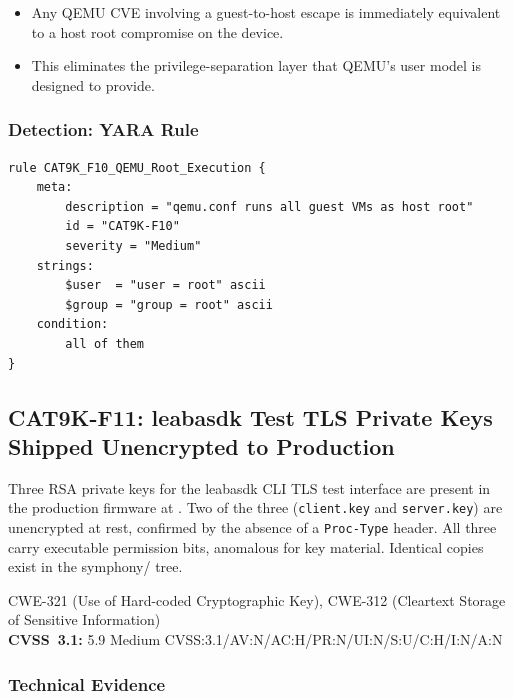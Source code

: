 \documentclass[11pt,a4paper]{article}
\begin{document}
\begin{itemize}[nosep]
  \item Any QEMU CVE involving a guest-to-host escape is immediately equivalent to
    a host root compromise on the device.
  \item This eliminates the privilege-separation layer that QEMU's user model is
    designed to provide.
\end{itemize}

\subsubsection{Detection: YARA Rule}

\begin{lstlisting}[style=yara]
rule CAT9K_F10_QEMU_Root_Execution {
    meta:
        description = "qemu.conf runs all guest VMs as host root"
        id = "CAT9K-F10"
        severity = "Medium"
    strings:
        $user  = "user = root" ascii
        $group = "group = root" ascii
    condition:
        all of them
}
\end{lstlisting}

\subsection{CAT9K-F11: leabasdk Test TLS Private Keys Shipped Unencrypted to Production}

\begin{overviewbox}
Three RSA private keys for the leabasdk CLI TLS test interface are present in the
production firmware at
. Two of the three
(\texttt{client.key} and \texttt{server.key}) are unencrypted at rest, confirmed by
the absence of a \texttt{Proc-Type} header. All three carry executable permission
bits, anomalous for key material. Identical copies exist in the symphony/ tree.

CWE-321 (Use of Hard-coded Cryptographic Key), CWE-312 (Cleartext Storage of Sensitive Information)\\
\textbf{CVSS~3.1:} 5.9 Medium \quad CVSS:3.1/AV:N/AC:H/PR:N/UI:N/S:U/C:H/I:N/A:N
\end{overviewbox}

\subsubsection{Technical Evidence}
\end{document}
